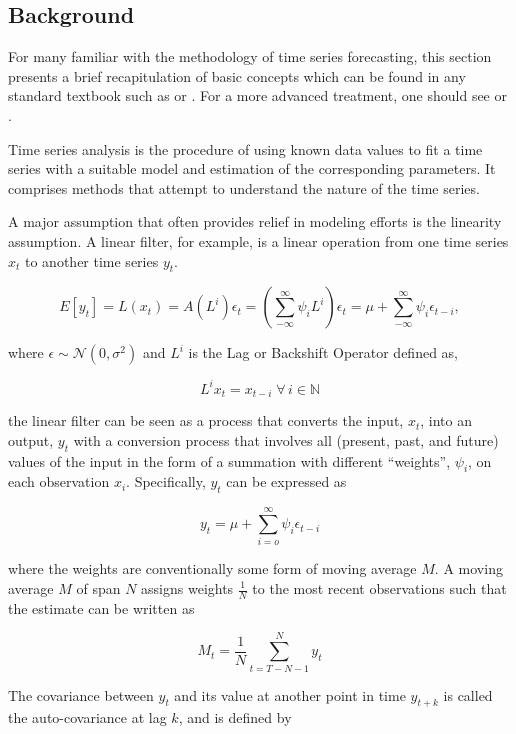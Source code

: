 \documentclass[
  11pt,
]{article}
\begin{document}
\hypertarget{background}{%
\subsection{Background}\label{background}}

For many familiar with the methodology of time series forecasting, this
section presents a brief recapitulation of basic concepts which can be
found in any standard textbook such as \cite{MJK} or \cite{brockwell02}.
For a more advanced treatment, one should see \cite{hamilton94} or
\cite{brockwell06}.

Time series analysis is the procedure of using known data values to fit
a time series with a suitable model and estimation of the corresponding
parameters. It comprises methods that attempt to understand the nature
of the time series.

A major assumption that often provides relief in modeling efforts is the
linearity assumption. A linear filter, for example, is a linear
operation from one time series \(x_{t}\) to another time series
\(y_{t}\).

\[
E[y_{t}] = L(x_{t}) = A(L^{i})\epsilon_{t} = \left(\sum\limits_{-\infty}^{\infty} \psi_{i}L^{i}\right)\epsilon_{t} = \mu + \sum\limits_{-\infty}^{\infty}\psi_{i}\epsilon_{t-i},
\]

where \(\epsilon \sim \mathcal{N}(0, \sigma^{2})\) and \(L^{i}\) is the
Lag or Backshift Operator defined as,

\[
L^{i}x_{t} = x_{t-i} \; \forall \, i \in \mathbb{N}
\]

the linear filter can be seen as a process that converts the input,
\(x_{t}\), into an output, \(y_{t}\) with a conversion process that
involves all (present, past, and future) values of the input in the form
of a summation with different ``weights'', \(\psi_{i}\), on each
observation \(x_{i}\). Specifically, \(y_{t}\) can be expressed as

\[
y_{t} = \mu + \sum\limits_{i= o}^{\infty}\psi_{i}\epsilon_{t-i}
\]

where the weights are conventionally some form of moving average \(M\).
A moving average \(M\) of span \(N\) assigns weights \(\frac{1}{N}\) to
the most recent observations such that the estimate can be written as

\[
M_{t} = \frac{1}{N} \sum\limits_{t = T - N - 1}^{N} y_{t}
\]

The covariance between \(y_{t}\) and its value at another point in time
\(y_{t + k}\) is called the auto-covariance at lag \(k\), and is defined
by
\end{document}
